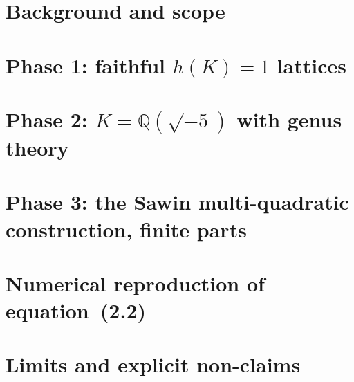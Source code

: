 \documentclass[11pt,a4paper]{article}
\theoremstyle{reproduction}
\newcommand{\Q}{\mathbb{Q}}
\begin{document}
\clearpage
\tableofcontents
\clearpage

\section{Background and scope}
\label{sec:background}



\section{Phase 1: faithful $h(K) = 1$ lattices}
\label{sec:phase1}



\section{Phase 2: $K = \Q(\sqrt{-5})$ with genus theory}
\label{sec:phase2}



\section{Phase 3: the Sawin multi-quadratic construction, finite parts}
\label{sec:phase3}



\section{Numerical reproduction of equation~(2.2)}
\label{sec:eq22}



\section{Limits and explicit non-claims}
\label{sec:limits}


\end{document}
